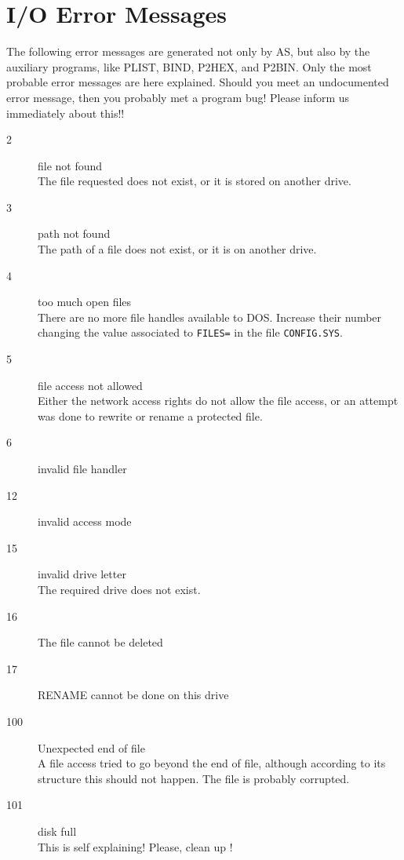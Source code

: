 \documentclass[12pt,twoside]{report}
\newcommand{\tty}[1]{{\tt #1}}
\newcommand{\asname}{{AS}}
\begin{document}

\cleardoublepage
\chapter{I/O Error Messages}

The following error messages are generated not only by \asname{}, but also by
the auxiliary programs, like PLIST, BIND, P2HEX, and P2BIN. Only the most
probable error messages are here explained. Should you meet an undocumented
error message, then you probably met a program bug! Please inform us
immediately about this!!

\begin{description}
\item[2]{file not found\\
         The file requested does not exist, or it is stored on another
         drive.}
\item[3]{path not found\\
         The path of a file does not exist, or it is on another drive.}
\item[4]{too much open files\\
         There are no more file handles available to DOS. Increase
         their number changing the value associated to \tty{FILES=} in the file
         \tty{CONFIG.SYS}.}
\item[5]{file access not allowed\\
         Either the network access rights do not allow the file access, or
         an attempt was done to rewrite or rename a protected file.}
\item[6]{invalid file handler}
\item[12]{invalid access mode}
\item[15]{invalid drive letter\\
         The required drive does not exist.}
\item[16]{The file cannot be deleted}
\item[17]{RENAME cannot be done on this drive}
\item[100]{Unexpected end of file\\
         A file access tried to go beyond the end of file, although according
         to its structure this should not happen. The file is probably
         corrupted.}
\item[101]{disk full\\
         This is self explaining! Please, clean up !}

\end{description}
\end{document}
